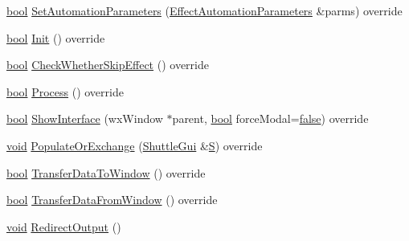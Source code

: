 \begin{DoxyCompactItemize}
\item 
\hyperlink{mac_2config_2i386_2lib-src_2libsoxr_2soxr-config_8h_abb452686968e48b67397da5f97445f5b}{bool} \hyperlink{class_nyquist_effect_a94b4504937c8a3beaafc54c921c91aed}{Set\+Automation\+Parameters} (\hyperlink{class_effect_automation_parameters}{Effect\+Automation\+Parameters} \&parms) override
\item 
\hyperlink{mac_2config_2i386_2lib-src_2libsoxr_2soxr-config_8h_abb452686968e48b67397da5f97445f5b}{bool} \hyperlink{class_nyquist_effect_ad450864ecdf4aaaf518cf2e6e02966a6}{Init} () override
\item 
\hyperlink{mac_2config_2i386_2lib-src_2libsoxr_2soxr-config_8h_abb452686968e48b67397da5f97445f5b}{bool} \hyperlink{class_nyquist_effect_aa9dcab23fe497eb8712c89f00b4a8a32}{Check\+Whether\+Skip\+Effect} () override
\item 
\hyperlink{mac_2config_2i386_2lib-src_2libsoxr_2soxr-config_8h_abb452686968e48b67397da5f97445f5b}{bool} \hyperlink{class_nyquist_effect_af40c82d256d59a50f92a18f70fe69228}{Process} () override
\item 
\hyperlink{mac_2config_2i386_2lib-src_2libsoxr_2soxr-config_8h_abb452686968e48b67397da5f97445f5b}{bool} \hyperlink{class_nyquist_effect_a75cbeaa4e43aafb4849a886c63f32d5c}{Show\+Interface} (wx\+Window $\ast$parent, \hyperlink{mac_2config_2i386_2lib-src_2libsoxr_2soxr-config_8h_abb452686968e48b67397da5f97445f5b}{bool} force\+Modal=\hyperlink{mac_2config_2i386_2lib-src_2libsoxr_2soxr-config_8h_a65e9886d74aaee76545e83dd09011727}{false}) override
\item 
\hyperlink{sound_8c_ae35f5844602719cf66324f4de2a658b3}{void} \hyperlink{class_nyquist_effect_abdee92123794984b8c7aa0bb67c29aae}{Populate\+Or\+Exchange} (\hyperlink{class_shuttle_gui}{Shuttle\+Gui} \&\hyperlink{xlftab_8c_af933676109efed7ab34cea71d748a517}{S}) override
\item 
\hyperlink{mac_2config_2i386_2lib-src_2libsoxr_2soxr-config_8h_abb452686968e48b67397da5f97445f5b}{bool} \hyperlink{class_nyquist_effect_a1a2a29c1306aaeebf009a7d764d09ff4}{Transfer\+Data\+To\+Window} () override
\item 
\hyperlink{mac_2config_2i386_2lib-src_2libsoxr_2soxr-config_8h_abb452686968e48b67397da5f97445f5b}{bool} \hyperlink{class_nyquist_effect_af43fc8f2992b17ec4e9b7cbca5b28066}{Transfer\+Data\+From\+Window} () override
\item 
\hyperlink{sound_8c_ae35f5844602719cf66324f4de2a658b3}{void} \hyperlink{class_nyquist_effect_a306010aa1636b91917425910e186b1e3}{Redirect\+Output} ()

\end{DoxyCompactItemize}
